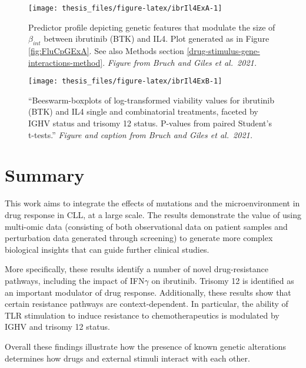 \documentclass[11pt, a4paper, twosided]{book}
\begin{document}
\begin{figure}

{\centering \texttt{[image: thesis\_files/figure-latex/ibrIl4ExA-1]} 

}

\caption{Predictor profile depicting genetic features that modulate the size of \(\beta_{int}\) between ibrutinib (BTK) and IL4. Plot generated as in Figure \ref{fig:FluCpGExA}. See also Methods section \ref{drug-stimulus-gene-interactions-method}. \emph{Figure from Bruch and Giles et al.~2021.}}\label{fig:ibrIl4ExA}
\end{figure}
\begin{figure}

{\centering \texttt{[image: thesis\_files/figure-latex/ibrIl4ExB-1]} 

}

\caption{``Beeswarm-boxplots of log-transformed viability values for ibrutinib (BTK) and IL4 single and combinatorial treatments, faceted by IGHV status and trisomy 12 status. P-values from paired Student's t-tests.'' \emph{Figure and caption from Bruch and Giles et al.~2021.}}\label{fig:ibrIl4ExB}
\end{figure}
\hypertarget{summary-2}{%
\section{Summary}\label{summary-2}}

This work aims to integrate the effects of mutations and the microenvironment in drug response in CLL, at a large scale. The results demonstrate the value of using multi-omic data (consisting of both observational data on patient samples and perturbation data generated through screening) to generate more complex biological insights that can guide further clinical studies.

More specifically, these results identify a number of novel drug-resistance pathways, including the impact of IFN\(\gamma\) on ibrutinib. Trisomy 12 is identified as an important modulator of drug response. Additionally, these results show that certain resistance pathways are context-dependent. In particular, the ability of TLR stimulation to induce resistance to chemotherapeutics is modulated by IGHV and trisomy 12 status.

Overall these findings illustrate how the presence of known genetic alterations determines how drugs and external stimuli interact with each other.
\end{document}

